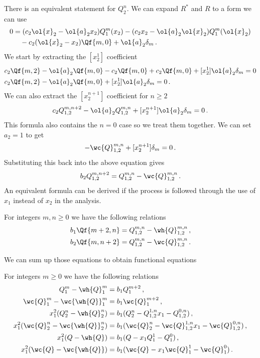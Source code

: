 There is an equivalent statement for $Q_2^n$. We can expand $R^\ast$ and $R$ to a form we can use
\begin{align}\begin{split}
	0 &=(c_2\ol{x}_2- \ol{a}_2x_2)Q_1^m(x_2) -( c_2x_2- \ol{a}_2\ol{x}_2)Q_1^m(\ol{x}_2) \\
	&\quad- c_2(\ol{x}_2-x_2)\Qf{m,0} + \ol{a}_2\delta_m \,.
\end{split}\end{align}
We start by extracting the $[x_2^1]$ coefficient
\begin{align}\begin{split}
	& c_2\Qf{m,2}- \ol{a}_2\Qf{m,0}-c_2\Qf{m,0} +c_2\Qf{m,0}+ [x_2^1] \ol{a}_2\delta_m = 0\\
	& c_2\Qf{m,2}- \ol{a}_2\Qf{m,0}+ [x_2^1] \ol{a}_2\delta_m = 0\,.
\end{split}\end{align}
We can also extract the $[x_2^{n+1}]$ coefficient for $n\geq 2$
\begin{align}
 	c_2 Q_{1,2}^{m,n+2}- \ol{a}_2Q_{1,2}^{m,n}+[x_2^{n+1}] \ol{a}_2\delta_m= 0\,.
\end{align}
This formula also contains the $n = 0$ case so we treat them together. We can set $a_2 = 1$ to get
\begin{align}
	-\wc{Q}_{1,2}^{m,n}+[x_2^{n+1}]\delta_m = 0\,.
\end{align}
Substituting this back into the above equation gives
\begin{align}
	b_2 Q_{1,2}^{m,n+2} = Q_{1,2}^{m,n} - \wc{Q}_{1,2}^{m,n}\,.
\end{align}
An equivalent formula can be derived if the process is followed through the use of $x_1$ instead of $x_2$ in the analysis.
\begin{corollary} For integers $m,n \ge 0$ we have the following relations
\begin{align}
	b_1 \Qf{m+2,n} &= Q_{1,2}^{m,n}-\wh{Q}_{1,2}^{m,n}\,,\\
	b_2 \Qf{m,n+2} &= Q_{1,2}^{m,n}-\wc{Q}_{1,2}^{m,n}\,.
\end{align}
\end{corollary}

We can sum up those equations to obtain functional equations
\begin{corollary} For integers $m \ge 0$ we have the following relations
\begin{align}
	Q_1^m - \wh{Q}_1^m &= b_1 Q_1^{m+2}\,,\\
	\wc{Q}_1^m - \wc{\wh{Q}}_1^m &= b_1 \wc{Q}_1^{m+2}\,,\\
	x_1^2(Q_2^n-\wh{Q}_2^n) &= b_1 (Q_2^n - Q_{1,2}^{1,n}x_1 - Q_{1,2}^{0,n})\,,\\
	x_1^2(\wc{Q}_2^n-\wc{\wh{Q}}_2^n) &= b_1 (\wc{Q}_2^n - \wc{Q}_{1,2}^{1,n}x_1 - \wc{Q}_{1,2}^{0,n})\,,\\
	x_1^2(Q-\wh{Q}) &= b_1(Q-x_1Q_1^1-Q_1^0)\,,\\
	x_1^2(\wc{Q}-\wc{\wh{Q}}) &= b_1(\wc{Q}-x_1\wc{Q}_1^1-\wc{Q}_1^0)\,.
\end{align}
\end{corollary}

